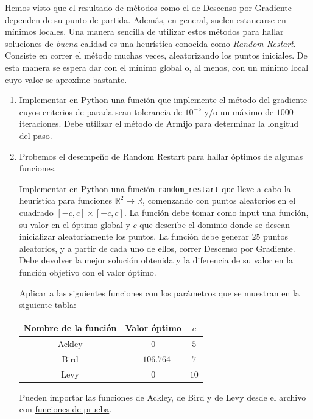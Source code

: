 \documentclass{article}
\begin{document}
Hemos visto que el resultado de métodos como el de Descenso por Gradiente dependen de su punto de partida. Además, en general, suelen estancarse en mínimos locales. Una manera sencilla de utilizar estos métodos para hallar soluciones de \textit{buena} calidad es una heurística conocida como \textit{Random Restart}. Consiste en correr el método muchas veces, aleatorizando los puntos iniciales. De esta manera se espera dar con el mínimo global o, al menos, con un mínimo local cuyo valor se aproxime bastante.

\begin{enumerate}
    \item Implementar en Python una función que implemente el método del gradiente cuyos criterios de parada sean tolerancia de $10^{-5}$ y/o un máximo de $1000$ iteraciones. Debe utilizar el método de Armijo para determinar la longitud del paso.
    \item Probemos el desempeño de Random Restart para hallar óptimos de algunas funciones. 
    
    Implementar en Python una función \texttt{random\_restart} que lleve a cabo la heurística para funciones $\mathbb{R}^2\rightarrow \mathbb{R}$, comenzando con puntos aleatorios en el cuadrado $[-c, c]\times [-c, c]$. La función debe tomar como input una función, su valor en el óptimo global y $c$ que describe el dominio donde se desean inicializar aleatoriamente los puntos. La función debe generar $25$ puntos aleatorios, y a partir de cada uno de ellos, correr Descenso por Gradiente. Debe devolver la mejor solución obtenida y la diferencia de su valor en la función objetivo con el valor óptimo.
    
    Aplicar a las siguientes funciones con los parámetros que se muestran en la siguiente tabla:
    \begin{center}
        \begin{tabular}{ccc}
        Nombre de la función & Valor óptimo & $c$  \\\midrule
        Ackley & $0$ & $5$ \\
        Bird & $-106.764$ & $7$ \\
        Levy & $0$ & $10$ 
        \end{tabular}
    \end{center}
    
    Pueden importar las funciones de Ackley, de Bird y de Levy desde el archivo con \href{https://gist.github.com/nz-angel/2ccfa60e45962e1732150575f8cf0983}{funciones de prueba}.


\end{enumerate}
\end{document}
